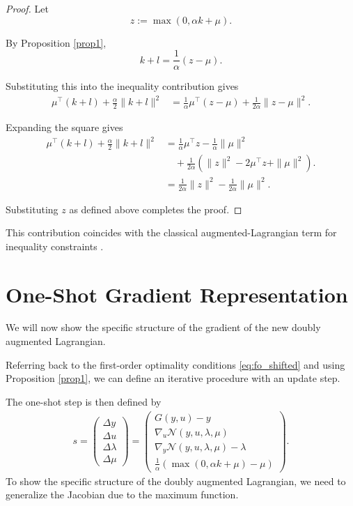 \documentclass[11pt]{article}
\begin{document}
\begin{proof}

Let
\[
z:=\max(0,\alpha k+\mu).
\]

By Proposition \ref{prop1},
\[ k+l = \frac{1}{\alpha}(z-\mu). \]

Substituting this into the inequality contribution gives
\begin{align*}
\mu^{\top}(k+l) + \frac{\alpha}{2}\|k+l\|^2
&= \frac{1}{\alpha}\mu^{\top}(z-\mu) + \frac{1}{2\alpha}\|z-\mu\|^2.
\end{align*}

Expanding the square gives
\begin{align*}
\mu^{\top}(k+l) + \frac{\alpha}{2}\|k+l\|^2
&=  \frac{1}{\alpha}\mu^{\top}z -\frac{1}{\alpha}\|\mu\|^2
\\
&\quad +\frac{1}{2\alpha} \left(
\|z\|^2 -2\mu^{\top}z +\|\mu\|^2 \right).\\
& = \frac{1}{2\alpha}\|z\|^2 -\frac{1}{2\alpha}\|\mu\|^2.
\end{align*}

Substituting $z$ as defined above completes the proof.

\end{proof}

This contribution coincides with the classical
augmented-Lagrangian term for inequality
constraints \cite{rockafellar1973multiplier}.

\section{One-Shot Gradient Representation}

We will now show the specific structure of the gradient of the new doubly augmented Lagrangian.

Referring back to the first-order optimality conditions \eqref{eq:fo_shifted} and using Proposition \ref{prop1}, we can define an iterative procedure with an update step.

The one-shot step is then defined by
\begin{align}
    \label{eq:os_step}
    s=
\begin{pmatrix}
\Delta y 
\\
\Delta u
\\
\Delta \lambda
\\
\Delta \mu
\end{pmatrix}
=
\begin{pmatrix}
G(y,u)-y 
\\
\nabla_u \mathcal{N}(y,u,\lambda, \mu)
\\
\nabla_y \mathcal{N}(y,u,\lambda, \mu)-\lambda
\\
\frac{1}{\alpha}(\max(0,\alpha k+\mu)-\mu)
\end{pmatrix}.
\end{align}
To show the specific structure of the doubly augmented Lagrangian, we need to generalize the Jacobian due to the maximum function. 
\end{document}
